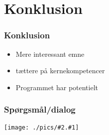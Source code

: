 \documentclass[xcolor={dvipsnames}]{beamer}
\newcommand{\pic}[2][png]{
	\begin{center}
	\texttt{[image: ./pics/\#2.\#1]}\\
	\end{center}
}
\begin{document}
\section{Konklusion}

\begin{frame}
\frametitle{Konklusion}
\begin{itemize}
\item Mere interessant emne 
\item tættere på kernekompetencer
\item Programmet har potentielt
\end{itemize}
\end{frame}

\begin{frame}
\frametitle{Spørgsmål/dialog}
\pic[jpg]{coding}
\end{frame}

\end{document}
